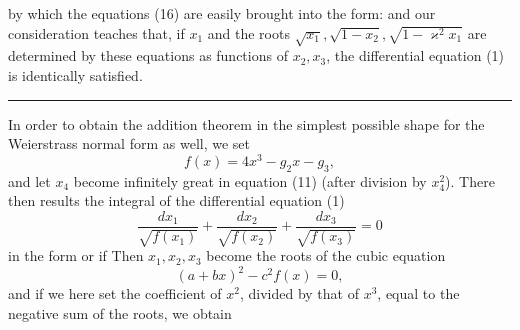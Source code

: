 by which the equations (16) are easily brought into the form:
and our consideration teaches that, if $x_1$ and the roots
$\sqrt{x_1}, \sqrt{1-x_2}, \sqrt{1-\varkappa^2x_1}$ %
are determined by these equations as functions
of $x_2, x_3$, the differential equation (1) is identically
satisfied.

\begin{center}\rule{2cm}{0.4pt}\end{center}

In order to obtain the addition theorem in the simplest possible
 shape for the Weierstrass normal form as well, we set
\[ f(x) = 4x^3 - g_2x - g_3, \]
and let $x_4$ become infinitely great in equation (11) (after division
 by $x_4^2$). There then results the integral of the
differential equation (1)
\[ \dfrac{dx_1}{\sqrt{f(x_1)}} + \dfrac{dx_2}{\sqrt{f(x_2)}} + \dfrac{dx_3}{\sqrt{f(x_3)}} = 0 \]
in the form
or
if
Then $x_1, x_2, x_3$ become the roots of the cubic
equation
\[ (a+bx)^2 - c^2f(x) = 0, \]
and if we here set the coefficient of $x^2$, divided by
that of $x^3$, equal to the negative sum of the roots, we
obtain
